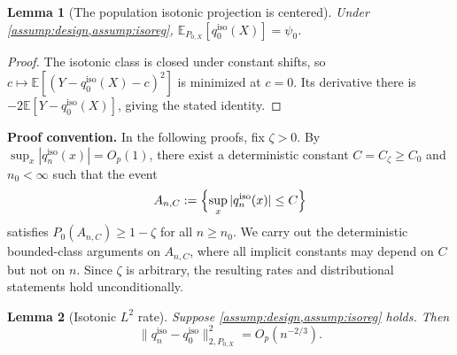 \documentclass{article}
\theoremstyle{plain}
\newtheorem{lemma}{Lemma}
\theoremstyle{definition}
\newcommand{\E}{\mathbb{E}}
\newcommand{\1}{\mathbf{1}}
\newcommand{\Px}{P_{0,X}}
\begin{document}
\begin{lemma}[The population isotonic projection is centered]
\label{lem:center}
Under \cref{assump:design,assump:isoreg},
\(\E_{\Px}[q_0^{\mathrm{iso}}(X)]=\psi_0\).
\end{lemma}
\begin{proof}
The isotonic class is closed under constant shifts, so
\(c\mapsto\E[(Y-q_0^{\mathrm{iso}}(X)-c)^2]\) is minimized at \(c=0\).
Its derivative there is \(-2\E[Y-q_0^{\mathrm{iso}}(X)]\), giving the stated identity.
\end{proof}

\textbf{Proof convention.} In the following proofs, fix \(\zeta>0\). By \(\sup_x |q_n^{\mathrm{iso}}(x)|=O_p(1)\), there exist a deterministic constant \(C=C_\zeta\ge C_0\) and \(n_0<\infty\) such that the event
\[
A_{n,C}:=\Bigl\{\sup_x |q_n^{\mathrm{iso}}(x)|\le C\Bigr\}
\]
satisfies \(P_0(A_{n,C})\ge 1-\zeta\) for all \(n\ge n_0\). We carry out the deterministic bounded-class arguments on \(A_{n,C}\), where all implicit constants may depend on \(C\) but not on \(n\). Since \(\zeta\) is arbitrary, the resulting rates and distributional statements hold unconditionally.

\begin{lemma}[Isotonic \(L^2\) rate]
\label{lem:isorate}
Suppose \cref{assump:design,assump:isoreg} holds. Then
\[
\|q_n^{\mathrm{iso}}-q_0^{\mathrm{iso}}\|_{2,\Px}^2=O_p(n^{-2/3}).
\]
\end{lemma}
\end{document}
